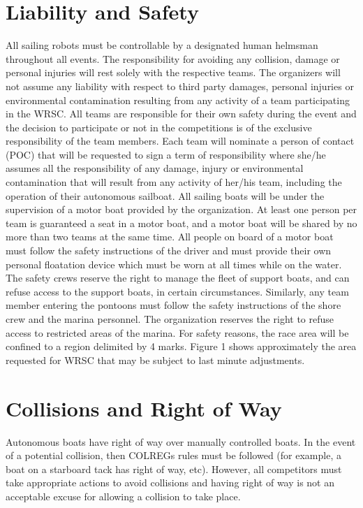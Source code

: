 \documentclass[12pt]{article}
\begin{document}
\section{Liability and Safety}
All sailing robots must be controllable by a designated human helmsman
throughout all events.
The responsibility for avoiding any collision, damage or personal injuries will
rest solely with
the respective teams. The organizers will not assume any liability with respect
to third party
damages, personal injuries or environmental contamination resulting from any
activity of a
team participating in the WRSC. All teams are responsible for their own safety
during the event
and the decision to participate or not in the competitions is of the exclusive
responsibility of
the team members.
Each team will nominate a person of contact (POC) that will be requested to sign
a term of
responsibility where she/he assumes all the responsibility of any damage, injury
or
environmental contamination that will result from any activity of her/his team,
including the
operation of their autonomous sailboat.
All sailing boats will be under the supervision of a motor boat provided by the
organization. At
least one person per team is guaranteed a seat in a motor boat, and a motor boat
will be shared
by no more than two teams at the same time. All people on board of a motor boat
must follow
the safety instructions of the driver and must provide their own personal
floatation device
which must be worn at all times while on the water. The safety crews reserve the
right to
manage the fleet of support boats, and can refuse access to the support boats,
in certain
circumstances. Similarly, any team member entering the pontoons must follow the
safety
instructions of the shore crew and the marina personnel. The organization
reserves the right to
refuse access to restricted areas of the marina.
For safety reasons, the race area will be confined to a region delimited by 4
marks. Figure 1
shows approximately the area requested for WRSC that may be subject to last
minute
adjustments.


\section{Collisions and Right of Way}
Autonomous boats have right of way over manually controlled boats. In the event
of a potential
collision, then COLREGs rules must be followed (for example, a boat on a
starboard tack has
right of way, etc). However, all competitors must take appropriate actions to
avoid collisions
and having right of way is not an acceptable excuse for allowing a collision to
take place.
\end{document}
